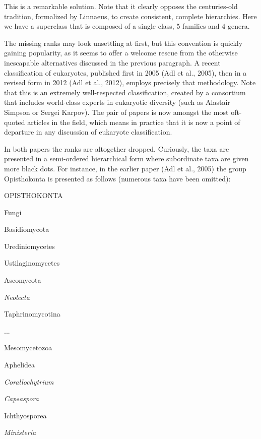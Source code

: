 \begin{artengenv}
This is a remarkable solution. Note that it clearly opposes the centuries-old tradition, formalized by Linnaeus, to
create consistent, complete hierarchies. Here we have a superclass that is composed of a single class, 5 families and 4
genera.

The missing ranks may look unsettling at first, but this convention is quickly gaining popularity, as it seems to offer
a welcome rescue from the otherwise inescapable alternatives discussed in the previous paragraph. A recent
classification of eukaryotes, published first in 2005 \label{ref:RND5C0kzbt9Jm}(Adl et al., 2005), then in a revised
form in 2012 \label{ref:RND2nC4dhq2C7}(Adl et al., 2012), employs precisely that methodology. Note that this is an
extremely well-respected classification, created by a consortium that includes world-class experts in eukaryotic
diversity (such as Alastair Simpson or Sergei Karpov). The pair of papers is now amongst the most oft-quoted articles
in the field, which means in practice that it is now a point of departure in any discussion of eukaryote
classification.

In both papers the ranks are altogether dropped. Curiously, the taxa are presented in a semi-ordered hierarchical form
where subordinate taxa are given more black dots. For instance, in the earlier paper \label{ref:RNDFR1OTfHJvd}(Adl et
al., 2005) the group Opisthokonta is presented as follows (numerous taxa have been omitted):

OPISTHOKONTA

 Fungi

 Basidiomycota

 Urediniomycetes

 Ustilaginomycetes

 Ascomycota

 \textit{Neolecta}

 Taphrinomycotina

...

 Mesomycetozoa

 Aphelidea

 \textit{Corallochytrium}

 \textit{Capsaspora}

 Ichthyosporea

 \textit{Ministeria}


\end{artengenv}
